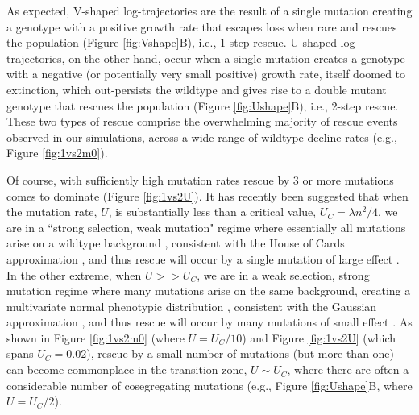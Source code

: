 \documentclass[9pt,twocolumn,twoside,lineno]{gsajnl}
\begin{document}
As expected, V-shaped log-trajectories are the result of a single mutation creating a genotype with a positive growth rate that escapes loss when rare and rescues the population (Figure \ref{fig:Vshape}B), i.e., 1-step rescue.
U-shaped log-trajectories, on the other hand, occur when a single mutation creates a genotype with a negative (or potentially very small positive) growth rate, itself doomed to extinction, which out-persists the wildtype and gives rise to a double mutant genotype that rescues the population (Figure \ref{fig:Ushape}B), i.e., 2-step rescue. 
These two types of rescue comprise the overwhelming majority of rescue events observed in our simulations, across a wide range of wildtype decline rates (e.g., Figure \ref{fig:1vs2m0}).

Of course, with sufficiently high mutation rates rescue by 3 or more mutations comes to dominate (Figure \ref{fig:1vs2U}).
It has recently been suggested that when the mutation rate, $U$, is substantially less than a critical value, $U_C = \lambda n^2/4$, we are in a ``strong selection, weak mutation" regime where essentially all mutations arise on a wildtype background \citep{martin2016nonstationary}, consistent with the House of Cards approximation \citep{turelli1984heritable,turelli1985effects}, and thus rescue will occur by a single mutation of large effect \citep{Anciaux2018}.
In the other extreme, when $U>>U_C$, we are in a weak selection, strong mutation regime where many mutations arise on the same background, creating a multivariate normal phenotypic distribution \citep{martin2016nonstationary}, consistent with the Gaussian approximation \citep{Kimura1965,lande1980genetic}, and thus rescue will occur by many mutations of small effect \citep{anciaux2019population}.
As shown in Figure \ref{fig:1vs2m0} (where $U=U_C / 10$) and Figure \ref{fig:1vs2U} (which spans $U_C=0.02$), rescue by a small number of mutations (but more than one) can become commonplace in the transition zone, $U \sim U_C$, where there are often a considerable number of cosegregating mutations (e.g., Figure \ref{fig:Ushape}B, where $U = U_C/2$).
\end{document}
